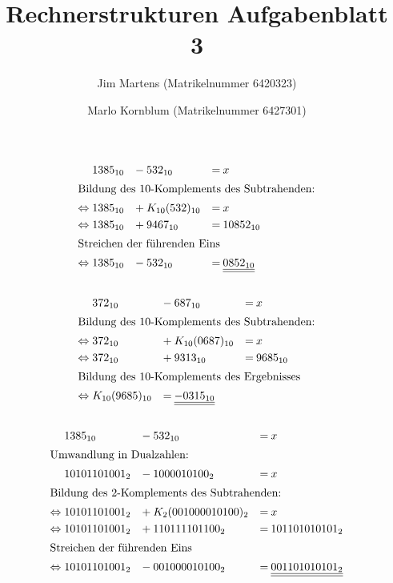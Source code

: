 \documentclass[10pt,a4paper,oneside,ngerman,numbers=noenddot]{scrartcl}
\begin{document}
\author{Jim Martens (Matrikelnummer 6420323) \and Marlo Kornblum (Matrikelnummer 6427301)}
\title{Rechnerstrukturen Aufgabenblatt 3}
\maketitle

\section{}%
\subsection{}
\begin{alignat}{3}
&\; 1385_{10} &-&\: 532_{10} &=&\: x\\
\intertext{Bildung des 10-Komplements des Subtrahenden:}
\Leftrightarrow &\; 1385_{10} &+&\: K_{10}(532)_{10} &=&\: x\\
\Leftrightarrow &\; 1385_{10} &+&\: 9467_{10} &=&\: 10852_{10}\\
\intertext{Streichen der führenden Eins}
\Leftrightarrow &\; 1385_{10} &-&\: 532_{10} &=&\: \underline{\underline{0852_{10}}}
\end{alignat}
\subsection{}
\begin{alignat}{3}
&\; 372_{10} &-&\: 687_{10} &=&\: x\\
\intertext{Bildung des 10-Komplements des Subtrahenden:}
\Leftrightarrow &\; 372_{10} &+&\: K_{10}(0687)_{10} &=&\: x\\
\Leftrightarrow &\; 372_{10} &+&\: 9313_{10} &=&\: 9685_{10}\\
\intertext{Bildung des 10-Komplements des Ergebnisses}
\Leftrightarrow &\; K_{10}(9685)_{10} &=&\: \underline{\underline{-0315_{10}}}
\end{alignat}
\subsection{}
\begin{alignat}{3}
&\; 1385_{10} &-&\: 532_{10} &=&\: x\\
\intertext{Umwandlung in Dualzahlen:}
&\; 10101101001_{2} &-&\: 1000010100_{2} &=&\: x\\
\intertext{Bildung des 2-Komplements des Subtrahenden:}
\Leftrightarrow &\; 10101101001_{2} &+&\: K_{2}(001000010100)_{2} &=&\: x\\
\Leftrightarrow &\; 10101101001_{2} &+&\: 110111101100_{2} &=&\: 101101010101_{2}\\
\intertext{Streichen der führenden Eins}
\Leftrightarrow &\; 10101101001_{2} &-&\: 001000010100_{2} &=&\: \underline{\underline{001101010101_{2}}}
\end{alignat}
\end{document}
